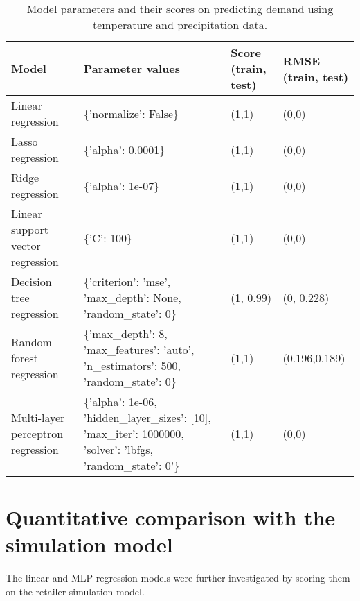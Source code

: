 \documentclass[final,authoryear,5p,times,twocolumn, 11pt]{elsarticle}
\begin{document}
\begin{table}[!b]
	\begin{tabular}{>{\raggedright}p{}>{\raggedright\arraybackslash}p{}>{\raggedright\arraybackslash}p{}>{\raggedright\arraybackslash}p{}}
		\hline
		Model                             & Parameter values                                                                                                  & Score (train, test) & RMSE (train, test) \\ \hline
		Linear regression                 & \{'normalize': False\}                                                                                            & (1,1)               & (0,0)              \\
		Lasso regression                  & \{'alpha': 0.0001\}                                                                                               & (1,1)               & (0,0)              \\
		Ridge regression                  & \{'alpha': 1e-07\}                                                                                                & (1,1)               & (0,0)              \\
		Linear support vector regression  & \{'C': 100\}                                                                                                      & (1,1)               & (0,0)              \\
		Decision tree regression          & \{'criterion': 'mse', 'max\_depth': None, 'random\_state': 0\}                                                    & (1, 0.99)           & (0, 0.228)         \\
		Random forest regression          & \{'max\_depth': 8, 'max\_features': 'auto', 'n\_estimators': 500, 'random\_state': 0\}                            & (1,1)               & (0.196,0.189)      \\
		Multi-layer perceptron regression & \{'alpha': 1e-06, 'hidden\_layer\_sizes': {[}10{]}, 'max\_iter': 1000000, 'solver': 'lbfgs, 'random\_state': 0'\} & (1,1)               & (0,0)              \\ \hline
		
	\end{tabular}
	\caption{Model parameters and their scores on predicting demand using temperature and precipitation data.}
	\label{tab:params}
\end{table}

\section{Quantitative comparison with the simulation model}
\label{sec:qc}
The linear and MLP regression models were further investigated by scoring them on the retailer simulation model.
\end{document}
